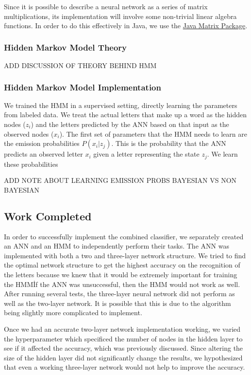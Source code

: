 \documentclass[11pt,a4paper,twocolumn]{article}
\begin{document}
Since it is possible to describe a neural network as a series of matrix multiplications, its
implementation will involve some non-trivial linear algebra functions. In order to do this
effectively in Java, we use the \href{http://math.nist.gov/javanumerics/jama/}{Java Matrix Package}.


\subsubsection*{Hidden Markov Model Theory}

ADD DISCUSSION OF THEORY BEHIND HMM

\subsubsection*{Hidden Markov Model Implementation}

We trained the HMM in a supervised setting, directly learning the parameters
from labeled data. We treat the actual letters that make up a word as the
hidden nodes ($z_i$) and the letters predicted by the ANN based on that
input as the observed nodes ($x_i$). The first set of parameters that the HMM
needs to learn are the emission probabilities $P(x_i | z_j)$. This is the probability
that the ANN predicts an observed letter $x_i$ given a letter representing
the state $z_j$. We learn these probabilities 

ADD NOTE ABOUT LEARNING EMISSION PROBS BAYESIAN VS NON BAYESIAN

\subsection*{Work Completed}
In order to successfully implement the combined classifier, we separately
created an ANN and an HMM to independently perform their tasks. The ANN was
implemented with both a two and three-layer network structure. We tried to
find the optimal network structure to get the highest accuracy on the
recognition of the letters because we knew that it would be extremely important
for training the HMM\. If the ANN was unsuccessful, then the HMM would not work
as well. After running several tests, the three-layer neural network did not
perform as well as the two-layer network. It is possible that this is due to
the algorithm being slightly more complicated to implement.

Once we had an accurate two-layer network implementation working, we varied the
hyperparameter which specificed the number of nodes in the hidden layer to see
if it affected the accuracy, which was previously discussed. Since altering the
size of the hidden layer did not significantly change the results, we
hypothesized that even a working three-layer network would not help to improve
the accuracy.
\end{document}
